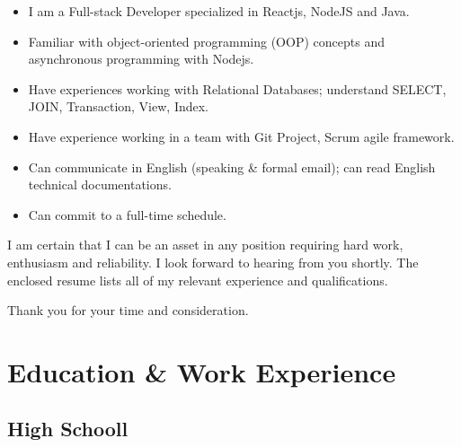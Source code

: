 \documentclass[11pt,a4paper,sans]{moderncv}        %
\begin{document}
\begin{itemize}
  \item I am a Full-stack Developer specialized in Reactjs, NodeJS and Java.
  \item Familiar with object-oriented programming (OOP) concepts and asynchronous programming with Nodejs.
  \item Have experiences working with Relational Databases; understand SELECT, JOIN, Transaction, View, Index.
  \item Have experience working in a team with Git Project, Scrum agile framework.
  \item Can communicate in English (speaking \& formal email); can read English technical documentations.
  \item Can commit to a full-time schedule.
\end{itemize}

I am certain that I can be an asset in any position requiring hard work, enthusiasm and reliability. I look forward to hearing from you shortly. The enclosed resume lists all of my relevant experience and qualifications.

Thank you for your time and consideration.

\makeletterclosing

\newpage


\makecvtitle

\section{Education \& Work Experience}

\subsection{High Schooll}
\end{document}
